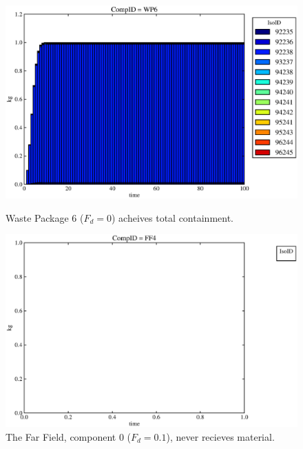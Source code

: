 \begin{figure}[ht]
\begin{minipage}[b]{0.45\linewidth}
\end{minipage}
\hspace{0.05\linewidth}
\begin{minipage}[b]{0.45\linewidth}
  \includegraphics[width=\textwidth]{./chapters/demonstration/base/drII2.eps}
  \caption[Case DRII Waste Package Contaminants.]{ 
    Waste Package 6 ($F_d = 0$) acheives total containment.
    }
  \label{fig:drIIwp6}

  \includegraphics[width=\textwidth]{./chapters/demonstration/base/drII0.eps}
  \caption[Case DRII Far Field Contaminants.]{ 
    The Far Field, component 0 ($F_d = 0.1$), never recieves material.
    }
  \label{fig:drIIff0}


  \end{minipage}
\end{figure}
\FloatBarrier

